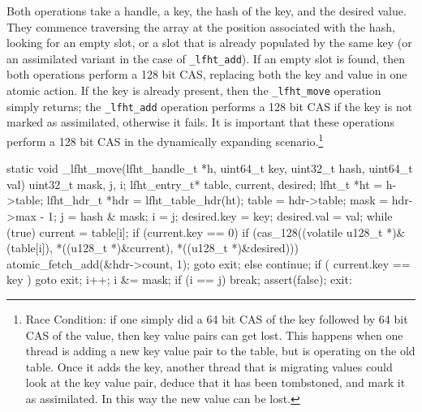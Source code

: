 Both operations take a handle, a key, the hash of the key, and the
desired value. They commence traversing the array at the position
associated with the hash, looking for an empty slot, or a slot that is
already populated by the same key (or an assimilated variant in the
case of \texttt{\_lfht\_add}). If an empty slot is found, then both operations
perform a 128 bit CAS, replacing both the key and value in one atomic action.
If the key is already present, then the \texttt{\_lfht\_move} operation simply
returns; the \texttt{\_lfht\_add} operation performs a 128 bit CAS if the key
is not marked as assimilated, otherwise it fails. It is important that these operations
perform a 128 bit CAS in the dynamically expanding scenario.\footnote{Race Condition: if one simply
  did a 64 bit CAS of the key followed by 64 bit CAS of the value, then key value pairs can get lost.
  This happens when one thread is adding a new key value pair to the table, but is operating on the
  old table. Once it adds the key, another thread that is migrating values could look at the
  key value pair, deduce that it has been tombstoned, and mark it as assimilated. In this way
  the new value can be lost.}



\begin{center}
\begin{clisting}
static void _lfht_move(lfht_handle_t *h, uint64_t key, uint32_t hash, uint64_t val){
  uint32_t mask, j, i;
  lfht_entry_t*  table, current, desired;
  lfht_t *ht = h->table;
  lfht_hdr_t *hdr = lfht_table_hdr(ht);
  table = hdr->table;
  mask = hdr->max - 1;
  j = hash & mask;
  i = j;
  desired.key = key;
  desired.val = val;
  while (true) {
    current = table[i];
    if (current.key == 0){
      if (cas_128((volatile u128_t *)&(table[i]), *((u128_t *)&current),  *((u128_t *)&desired))){
        atomic_fetch_add(&hdr->count, 1);
        goto exit;
      } else {
        continue;
      }
    }
    if ( current.key ==  key ){
      goto exit;
    }
    i++;
    i &= mask;
    if (i == j) break;
  }
  assert(false);
 exit:
}
\end{clisting}
\end{center}




